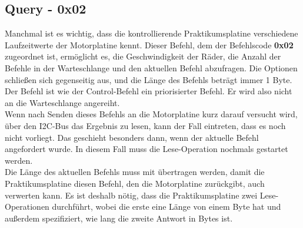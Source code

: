 \subsection{Query - 0x02}
Manchmal ist es wichtig, dass die kontrollierende Praktikumsplatine verschiedene Laufzeitwerte
der Motorplatine kennt. Dieser Befehl, dem der Befehlscode \textbf{0x02} zugeordnet ist, ermöglicht
es, die Geschwindigkeit der Räder, die Anzahl der Befehle in der Warteschlange und den aktuellen
Befehl abzufragen. Die Optionen schließen sich gegenseitig aus, und die Länge des Befehls beträgt
immer 1 Byte. Der Befehl ist wie der Control-Befehl ein priorisierter Befehl. Er wird also
nicht an die Warteschlange angereiht.\\
Wenn nach Senden dieses Befehls an die Motorplatine kurz darauf versucht wird, über den I2C-Bus
das Ergebnis zu lesen, kann der Fall eintreten, dass es noch nicht vorliegt.
Das geschieht besonders dann, wenn der aktuelle Befehl angefordert wurde.
In diesem Fall muss die Lese-Operation nochmals gestartet werden.\\
Die Länge des aktuellen Befehls muss mit übertragen werden, damit die Praktikumsplatine
diesen Befehl, den die Motorplatine zurückgibt, auch verwerten kann.
Es ist deshalb nötig, dass die Praktikumsplatine zwei Lese-Operationen durchführt,
wobei die erste eine Länge von einem Byte hat und außerdem spezifiziert, wie lang die zweite Antwort in Bytes ist.

